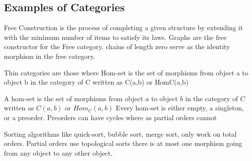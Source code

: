 \subsection{Examples of Categories}

Free Construction is the process of completing a given structure by extending it with the minimum number of items to satisfy its laws. Graphs are the free constructor for the Free category. chains of length zero serve as the identity morphism in the free category.

Thin categories are those where Hom-set is the set of morphisms from object a to object b in the category of C written as C(a,b) or HomC(a,b)

A hom-set is the set of morphisms from object $a$ to object $b$ in the category of $C$ written as $C(a,b)$ or $Hom_C(a,b)$
Every hom-set is either empty, a singleton, or a preorder.
Preorders can have cycles where as partial orders cannot

Sorting algorithms like quick-sort, bubble sort, merge sort, only work on total orders. Partial orders use topological sorts
there is at most one morphism going from any object to any other object.

